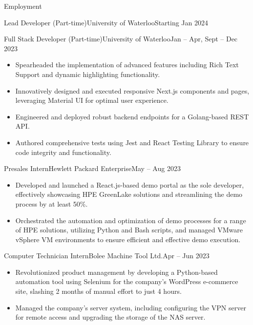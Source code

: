 \documentclass[]{mcdowellcv}
\begin{document}
	\makeheader
	
	\begin{cvsection}{Employment}
		\begin{cvsubsection}{Lead Developer (Part-time)}{University of Waterloo}{Starting Jan 2024}		
		\end{cvsubsection}
		\begin{cvsubsection}{Full Stack Developer (Part-time)}{University of Waterloo}{Jan -- Apr, Sept -- Dec 2023}
			\begin{itemize}
				\item Spearheaded the implementation of advanced features including Rich Text Support and dynamic highlighting functionality.
				\item Innovatively designed and executed responsive Next.js components and pages, leveraging Material UI for optimal user experience.
				\item Engineered and deployed robust backend endpoints for a Golang-based REST API.
				\item Authored comprehensive tests using Jest and React Testing Library to ensure code integrity and functionality.
			\end{itemize}
		\end{cvsubsection}
		\begin{cvsubsection}{Presales Intern}{Hewlett Packard Enterprise}{May -- Aug 2023}	
			\begin{itemize}
				\item Developed and launched a React.js-based demo portal as the sole developer, effectively showcasing HPE GreenLake solutions and streamlining the demo process by at least 50\%.
				\item Orchestrated the automation and optimization of demo processes for a range of HPE solutions, utilizing Python and Bash scripts, and managed VMware vSphere VM environments to ensure efficient and effective demo execution.
			\end{itemize}
		\end{cvsubsection}
		\begin{cvsubsection}{Computer Technician Intern}{Bolee Machine Tool Ltd.}{Apr -- Jun 2023}	
			\begin{itemize}
				\item Revolutionized product management by developing a Python-based automation tool using Selenium for the company's WordPress e-commerce site, slashing 2 months of manual effort to just 4 hours.
				\item Managed the company’s server system, including configuring the VPN server for remote access and upgrading the storage of the NAS server.
			\end{itemize}
		\end{cvsubsection}
	\end{cvsection}
	
\end{document}
